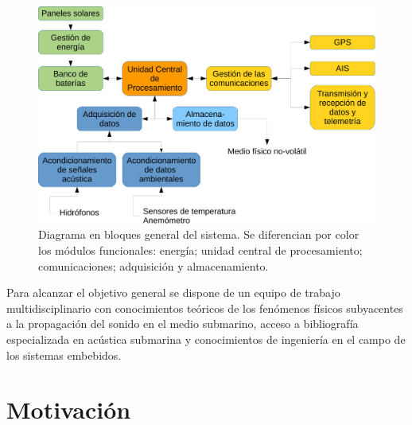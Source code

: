 \begin{figure}[ht]
  \centering
	\includegraphics[width=\textwidth]{./Figures/Diagrama_en_Bloques.pdf}
	\caption[Diagrama en bloques general del sistema.]{Diagrama en bloques general del sistema. Se diferencian por color los módulos funcionales: energía; unidad central de procesamiento; comunicaciones; adquisición y almacenamiento.}
	\label{fig:diagramaBloques}
\end{figure}

Para alcanzar el objetivo general se dispone de un equipo de trabajo multidisciplinario con conocimientos teóricos de los fenómenos físicos subyacentes a la propagación del sonido en el medio submarino, acceso a bibliografía especializada en acústica submarina y  conocimientos de ingeniería en el campo de los sistemas embebidos.





\section{Motivación}
\label{motivacion}

